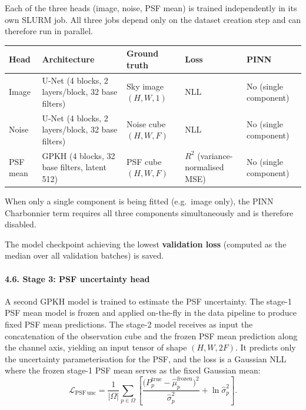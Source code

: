 \documentclass{aa}
\begin{document}
Each of the three heads (image, noise, PSF mean) is trained independently in its own SLURM job. All three jobs depend only on the dataset creation step and can therefore run in parallel.

\begin{table}[h]
\centering
\begin{tabular}{|l|l|l|l|l|}
\hline
\textbf{Head} & \textbf{Architecture} & \textbf{Ground truth} & \textbf{Loss} & \textbf{PINN} \\
\hline
Image & U-Net (4 blocks, 2 layers/block, 32 base filters) & Sky image $(H, W, 1)$ & NLL & No (single component) \\
Noise & U-Net (4 blocks, 2 layers/block, 32 base filters) & Noise cube $(H, W, F)$ & NLL & No (single component) \\
PSF mean & GPKH (4 blocks, 32 base filters, latent 512) & PSF cube $(H, W, F)$ & $R^2$ (variance-normalised MSE) & No (single component) \\
\hline
\end{tabular}
\end{table}

When only a single component is being fitted (e.g.\ image only), the PINN Charbonnier term requires all three components simultaneously and is therefore disabled.

The model checkpoint achieving the lowest \textbf{validation loss} (computed as the median over all validation batches) is saved.

\paragraph{4.6. Stage 3: PSF uncertainty head}

A second GPKH model is trained to estimate the PSF uncertainty. The stage-1 PSF mean model is frozen and applied on-the-fly in the data pipeline to produce fixed PSF mean predictions. The stage-2 model receives as input the concatenation of the observation cube and the frozen PSF mean prediction along the channel axis, yielding an input tensor of shape $(H, W, 2F)$. It predicts only the uncertainty parameterisation for the PSF, and the loss is a Gaussian NLL where the frozen stage-1 PSF mean serves as the fixed Gaussian mean:
\begin{equation}
\mathcal{L}_{\mathrm{PSF\,unc}} =
\frac{1}{|\Omega|} \sum_{p \in \Omega}
\left[
\frac{\bigl(P_p^{\mathrm{true}} - \hat{\mu}_p^{\mathrm{frozen}}\bigr)^2}{\hat{\sigma}_p^2}
+ \ln \hat{\sigma}_p^2
\right].
\end{equation}
\end{document}
